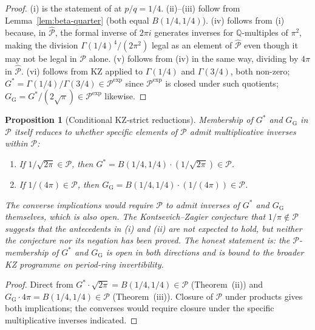 \documentclass[11pt]{article}
\newtheorem{proposition}[theorem]{Proposition}
\theoremstyle{definition}
\theoremstyle{remark}
\newcommand{\Gs}{G^{*}}
\newcommand{\GG}{G_{\!\scriptscriptstyle\mathrm{G}}}
\newcommand{\Q}{\mathbb{Q}}
\begin{document}
\begin{proof}
(i) is the statement of \cite[\S1.1, Eq.~6]{kontsevich-zagier} at $p/q = 1/4$.
(ii)--(iii) follow from Lemma~\ref{lem:beta-quarter} (both equal $B(1/4,1/4)$).
(iv) follows from (i) because, in $\widehat{\mathcal{P}}$, the formal inverse
of $2\pi i$ generates inverses for $\Q$-multiples of $\pi^{2}$, making the
division $\Gamma(1/4)^{4}/(2\pi^{2})$ legal as an element of
$\widehat{\mathcal{P}}$ even though it may not be legal in $\mathcal{P}$ alone.
(v) follows from (iv) in the same way, dividing by $4\pi$ in
$\widehat{\mathcal{P}}$. (vi) follows from KZ \cite[\S4.3]{kontsevich-zagier}
applied to $\Gamma(1/4)$ and $\Gamma(3/4)$, both non-zero;
$\Gs = \Gamma(1/4)/\Gamma(3/4) \in \mathcal{P}^{\exp}$ since
$\mathcal{P}^{\exp}$ is closed under such quotients; $\GG = \Gs/(2\sqrt\pi)
\in \mathcal{P}^{\exp}$ likewise.
\end{proof}

\begin{proposition}[Conditional KZ-strict reductions]\label{prop:KZ-conditional}
Membership of $\Gs$ and $\GG$ in $\mathcal{P}$ itself reduces to whether
specific elements of $\mathcal{P}$ admit multiplicative inverses
\emph{within} $\mathcal{P}$:
\begin{enumerate}[label=\textup{(\roman*)}, leftmargin=*, itemsep=2pt]
\item If $1/\sqrt{2\pi} \in \mathcal{P}$, then
$\Gs = B(1/4, 1/4)\cdot(1/\sqrt{2\pi}) \in \mathcal{P}$.
\item If $1/(4\pi) \in \mathcal{P}$, then
$\GG = B(1/4, 1/4)\cdot(1/(4\pi)) \in \mathcal{P}$.
\end{enumerate}
The converse implications would require $\mathcal{P}$ to admit inverses
of $\Gs$ and $\GG$ themselves, which is also open. The Kontsevich--Zagier
conjecture that $1/\pi \notin \mathcal{P}$ \cite[Problem~3]{kontsevich-zagier}
suggests that the antecedents in (i) and (ii) are not expected to hold,
but neither the conjecture nor its negation has been proved. The honest
statement is: \emph{the $\mathcal{P}$-membership of $\Gs$ and $\GG$ is
open in both directions and is bound to the broader KZ programme on
period-ring invertibility}.
\end{proposition}

\begin{proof}
Direct from $\Gs \cdot \sqrt{2\pi} = B(1/4,1/4) \in \mathcal{P}$ (Theorem~(ii))
and $\GG \cdot 4\pi = B(1/4,1/4) \in \mathcal{P}$ (Theorem~(iii)).
Closure of $\mathcal{P}$ under products gives both implications; the
converses would require closure under the specific multiplicative
inverses indicated.
\end{proof}
\end{document}
